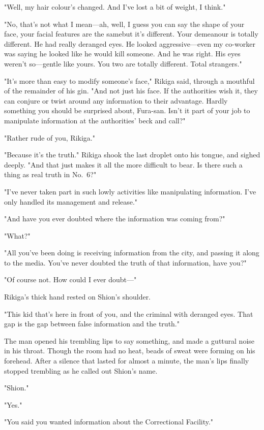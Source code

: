 "Well, my hair colour's changed. And I've lost a bit of weight, I
think."

"No, that's not what I mean---ah, well, I guess you can say the shape of
your face, your facial features are the same\el but it's different. Your
demeanour is totally different. He had really deranged eyes. He looked
aggressive---even my co-worker was saying he looked like he would kill
someone. And he was right. His eyes weren't so---gentle like yours. You
two are totally different. Total strangers."

"It's more than easy to modify someone's face," Rikiga said, through a
mouthful of the remainder of his gin. "And not just his face. If the
authorities wish it, they can conjure or twist around any information to
their advantage. Hardly something you should be surprised about,
Fura-san. Isn't it part of your job to manipulate information at the
authorities' beck and call?"

"Rather rude of you, Rikiga."

"Because it's the truth." Rikiga shook the last droplet onto his tongue,
and sighed deeply. "And that just makes it all the more difficult to
bear. Is there such a thing as real truth in No.~6?"

"I've never taken part in such lowly activities like manipulating
information. I've only handled its management and release."

"And have you ever doubted where the information was coming from?"

"What?"

"All you've been doing is receiving information from the city, and
passing it along to the media. You've never doubted the truth of that
information, have you?"

"Of course not. How could I ever doubt---"

Rikiga's thick hand rested on Shion's shoulder.

"This kid that's here in front of you, and the criminal with deranged
eyes. That gap is the gap between false information and the truth."

The man opened his trembling lips to say something, and made a guttural
noise in his throat. Though the room had no heat, beads of sweat were
forming on his forehead. After a silence that lasted for almost a
minute, the man's lips finally stopped trembling as he called out
Shion's name.

"Shion."

"Yes."

"You said you wanted information about the Correctional Facility."

